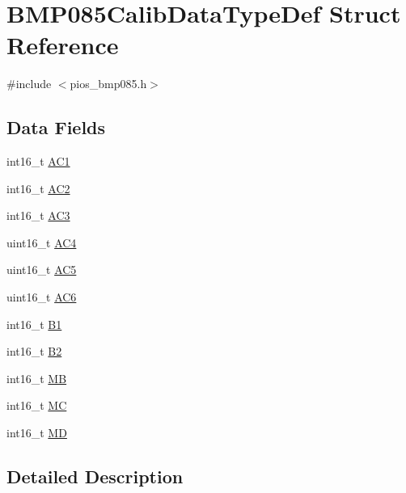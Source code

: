 \hypertarget{struct_b_m_p085_calib_data_type_def}{\section{\-B\-M\-P085\-Calib\-Data\-Type\-Def \-Struct \-Reference}
\label{struct_b_m_p085_calib_data_type_def}
}


{\ttfamily \#include $<$pios\-\_\-bmp085.\-h$>$}

\subsection*{\-Data \-Fields}
\begin{DoxyCompactItemize}
\item 
int16\-\_\-t \hyperlink{struct_b_m_p085_calib_data_type_def_a161f72fdd77f428497ee05b818064f40}{\-A\-C1}
\item 
int16\-\_\-t \hyperlink{struct_b_m_p085_calib_data_type_def_ac4f5e67f3bb8b7302d1394e3e0fa60fa}{\-A\-C2}
\item 
int16\-\_\-t \hyperlink{struct_b_m_p085_calib_data_type_def_a482f54f54d2adcb6e34ec46f9ad621e0}{\-A\-C3}
\item 
uint16\-\_\-t \hyperlink{struct_b_m_p085_calib_data_type_def_a4e595e57196b38e68364e6251350ac95}{\-A\-C4}
\item 
uint16\-\_\-t \hyperlink{struct_b_m_p085_calib_data_type_def_aa844386cfe53dd2efeb4e3f4445282a1}{\-A\-C5}
\item 
uint16\-\_\-t \hyperlink{struct_b_m_p085_calib_data_type_def_af89ddaa314bab8170726cd9ab0e6fc91}{\-A\-C6}
\item 
int16\-\_\-t \hyperlink{struct_b_m_p085_calib_data_type_def_a6f5c6e5cc70b5569922dc9c72fd80b6c}{\-B1}
\item 
int16\-\_\-t \hyperlink{struct_b_m_p085_calib_data_type_def_a895d74abbbe7071148feed73f8217a20}{\-B2}
\item 
int16\-\_\-t \hyperlink{struct_b_m_p085_calib_data_type_def_a3e2e7b4e98edcfceeb7af2c622db30e9}{\-M\-B}
\item 
int16\-\_\-t \hyperlink{struct_b_m_p085_calib_data_type_def_a1665d1134225ff27705293714f8301f6}{\-M\-C}
\item 
int16\-\_\-t \hyperlink{struct_b_m_p085_calib_data_type_def_a8bc67ebe1ea785684147c375ccc9b1be}{\-M\-D}
\end{DoxyCompactItemize}


\subsection{\-Detailed \-Description}


